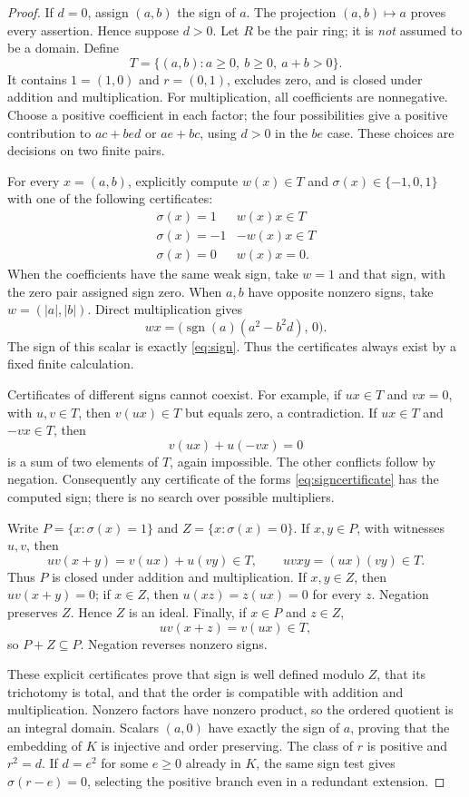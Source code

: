 \documentclass[11pt,a4paper]{article}
\theoremstyle{definition}
\newcommand{\sgn}{\operatorname{sgn}}
\begin{document}
\begin{proof}
If \(d=0\), assign \((a,b)\) the sign of \(a\). The projection
\((a,b)\mapsto a\) proves every assertion. Hence suppose \(d>0\).
Let \(R\) be the pair ring; it is \emph{not} assumed to be a domain.
Define
\[
 T=\{(a,b):a\ge0,\ b\ge0,\ a+b>0\}.
\]
It contains \(1=(1,0)\) and \(r=(0,1)\), excludes zero, and is closed
under addition and multiplication. For multiplication, all coefficients
are nonnegative. Choose a positive coefficient in each factor; the
four possibilities give a positive contribution to \(ac+bed\) or
\(ae+bc\), using \(d>0\) in the \(be\) case.
These choices are decisions on two finite pairs.

For every \(x=(a,b)\), explicitly compute \(w(x)\in T\) and
\(\sigma(x)\in\{-1,0,1\}\) with one of the following certificates:
\[
 \begin{array}{c|c}
 \sigma(x)=1&w(x)x\in T\\
 \sigma(x)=-1&-w(x)x\in T\\
 \sigma(x)=0&w(x)x=0.
 \end{array}
 \tag{2.4}\label{eq:signcertificate}
\]
When the coefficients have the same weak sign, take \(w=1\) and
that sign, with the zero pair assigned sign zero. When \(a,b\) have
opposite nonzero signs, take \(w=(|a|,|b|)\). Direct multiplication gives
\[
 wx=\bigl(\sgn(a)(a^2-b^2d),\,0\bigr).
 \tag{2.5}\label{eq:conecertificate}
\]
The sign of this scalar is exactly \eqref{eq:sign}. Thus the
certificates always exist by a fixed finite calculation.

Certificates of different signs cannot coexist. For example, if
\(ux\in T\) and \(vx=0\), with \(u,v\in T\), then \(v(ux)\in T\)
but equals zero, a contradiction. If \(ux\in T\) and \(-vx\in T\),
then
\[
 v(ux)+u(-vx)=0
\]
is a sum of two elements of \(T\), again impossible. The other
conflicts follow by negation. Consequently any certificate of the
forms \eqref{eq:signcertificate} has the computed sign; there is no
search over possible multipliers.

Write \(P=\{x:\sigma(x)=1\}\) and \(Z=\{x:\sigma(x)=0\}\).
If \(x,y\in P\), with witnesses \(u,v\), then
\[
 uv(x+y)=v(ux)+u(vy)\in T,\qquad
 uvxy=(ux)(vy)\in T.
\]
Thus \(P\) is closed under addition and multiplication.
If \(x,y\in Z\), then \(uv(x+y)=0\); if \(x\in Z\), then
\(u(xz)=z(ux)=0\) for every \(z\). Negation preserves \(Z\).
Hence \(Z\) is an ideal. Finally, if \(x\in P\) and \(z\in Z\),
\[
 uv(x+z)=v(ux)\in T,
\]
so \(P+Z\subseteq P\). Negation reverses nonzero signs.

These explicit certificates prove that sign is well defined modulo
\(Z\), that its trichotomy is total, and that the order is compatible
with addition and multiplication. Nonzero factors have nonzero product,
so the ordered quotient is an integral domain. Scalars \((a,0)\)
have exactly the sign of \(a\), proving that the embedding of \(K\)
is injective and order preserving. The class of \(r\) is positive
and \(r^2=d\). If \(d=e^2\) for some \(e\ge0\) already in \(K\),
the same sign test gives \(\sigma(r-e)=0\), selecting the positive
branch even in a redundant extension.
\end{proof}
\end{document}
